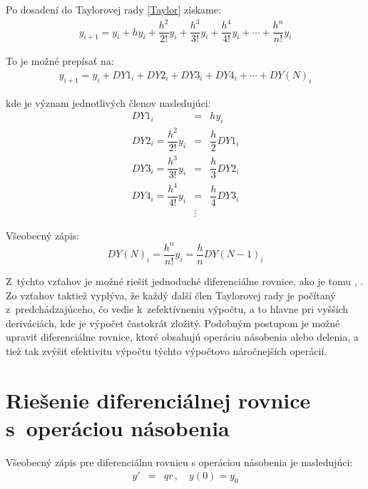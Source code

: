 Po dosadení do Taylorovej rady \eqref{Taylor} získame:
\begin{eqnarray}
y_{i + 1} = y_{i} + h y_{i} + \dfrac{h^{2}}{2!}y_{i} + \dfrac{h^{3}}{3!}y_{i} + \dfrac{h^{4}}{4!}y_{i} + \cdots + \dfrac{h^{n}}{n!}y_{i}
\end{eqnarray}


To je možné prepísať na:
\begin{eqnarray}
y_{i + 1} = y_{i} + DY1_{i} + DY2_{i} + DY3_{i} + DY4_{i} + \cdots + DY(N)_{i} \label{TaylorDYcleny}
\end{eqnarray}

kde je význam jednotlivých členov nasledujúci:
\begin{eqnarray}
DY1_{i} & = & h y_{i} \label{DY_cleny} \\
DY2_{i} = \dfrac{h^{2}}{2!}y_{i} & = & \dfrac{h}{2} DY1_{i} \nonumber \\
DY3_{i} = \dfrac{h^{3}}{3!}y_{i} & = & \dfrac{h}{3} DY2_{i} \nonumber \\
DY4_{i} = \dfrac{h^{4}}{4!}y_{i} & = & \dfrac{h}{4} DY3_{i} \nonumber \\
& \vdots & \nonumber
\end{eqnarray}

Všeobecný zápis:
\begin{equation}
DY(N)_{i} =  \dfrac{h^{n}}{n!}y_{i} = \dfrac{h}{n} DY(N-1)_{i} \nonumber
\end{equation}

Z~týchto vzťahov je možné riešiť jednoduché diferenciálne rovnice, ako je tomu \cite{OpalkaBP}, \cite{KrausDisP}.
Zo vzťahov taktiež vyplýva, že každý ďalší člen Taylorovej rady je počítaný z~predchádzajúceho, čo vedie k~zefektívneniu výpočtu, a to hlavne pri vyšších deriváciách, kde je výpočet častokrát zložitý. Podobným postupom je možné upraviť diferenciálne rovnice, ktoré obsahujú operáciu násobenia alebo delenia, a tiež tak zvýšiť efektivitu výpočtu týchto výpočtovo náročnejších operácií. 


\section{Riešenie diferenciálnej rovnice s~operáciou násobenia}
Všeobecný zápis pre diferenciálnu rovnicu s operáciou násobenia je nasledujúci:
\begin{eqnarray}
y' & = & qr \, , \quad y(0) = y_{0} \label{dif_nasobenie}
\end{eqnarray}

